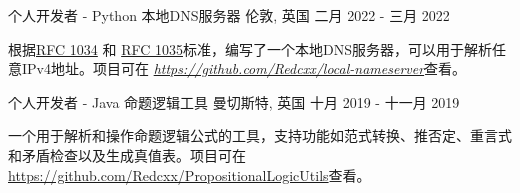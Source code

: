 \begin{cventries}
  

  \cventry
    {个人开发者 - Python} %
    {本地DNS服务器} %
    {伦敦, 英国} %
    {二月 2022 - 三月 2022} %
    {
      \begin{cvitems} %
        \item {根据\href{https://datatracker.ietf.org/doc/html/rfc1034}{RFC 1034} 和 \href{https://datatracker.ietf.org/doc/html/rfc1035}{RFC 1035}标准，编写了一个本地DNS服务器，可以用于解析任意IPv4地址。项目可在 \href{https://github.com/Redcxx/local-nameserver}{\textit{https://github.com/Redcxx/local-nameserver}}查看。}
      \end{cvitems}
    }
    


  \cventry
    {个人开发者 - Java} %
    {命题逻辑工具} %
    {曼切斯特, 英国} %
    {十月 2019 - 十一月 2019} %
    {
      \begin{cvitems} %
        \item {一个用于解析和操作命题逻辑公式的工具，支持功能如范式转换、推否定、重言式和矛盾检查以及生成真值表。项目可在\href{https://github.com/Redcxx/PropositionalLogicUtils}{https://github.com/Redcxx/PropositionalLogicUtils}查看。}
      \end{cvitems}
    }


\end{cventries}
